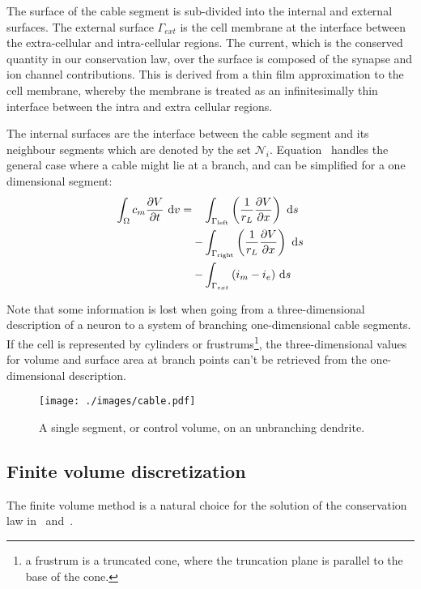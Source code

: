 The surface of the cable segment is sub-divided into the internal and external surfaces.
The external surface $\Gamma_{ext}$ is the cell membrane at the interface between the extra-cellular and intra-cellular regions.
The current, which is the conserved quantity in our conservation law, over the surface is composed of the synapse and ion channel contributions.
This is derived from a thin film approximation to the cell membrane, whereby the membrane is treated as an infinitesimally thin interface between the intra and extra cellular regions.

The internal surfaces are the interface between the cable segment and its neighbour segments which are denoted by the set $\mathcal{N}_i$.
Equation~ handles the general case where a cable might lie at a branch, and can be simplified for a one dimensional segment:
\begin{align}
    \int_{\Omega}{c_m \frac{\partial{V}}{\partial{t}} } ~\text{d}{v} =
        \quad &   \int_{\Gamma_{\text{left}}}  \left( \frac{1}{r_L}\frac{\partial{V}}{\partial{x}} \right) ~\text{d}{s} \nonumber \\
        -&  \int_{\Gamma_{\text{right}}} \left( \frac{1}{r_L}\frac{\partial{V}}{\partial{x}} \right) ~\text{d}{s} \nonumber \\
        -&  \int_{\Gamma_{ext}} {(i_m - i_e)} ~\text{d}{s}
    \label{eq:cable_balance_1D}
\end{align}

Note that some information is lost when going from a three-dimensional description of a neuron to a system of branching one-dimensional cable segments.
If the cell is represented by cylinders or frustrums\footnote{a frustrum is a truncated cone, where the truncation plane is parallel to the base of the cone.}, the three-dimensional values for volume and surface area at branch points can't be retrieved from the one-dimensional description.

\begin{figure}
    \begin{center}
        \texttt{[image: ./images/cable.pdf]}
    \end{center}
    \caption{A single segment, or control volume, on an unbranching dendrite.}
    \label{fig:segment}
\end{figure}

\subsection{Finite volume discretization}
The finite volume method is a natural choice for the solution of the conservation law in~ and~.

